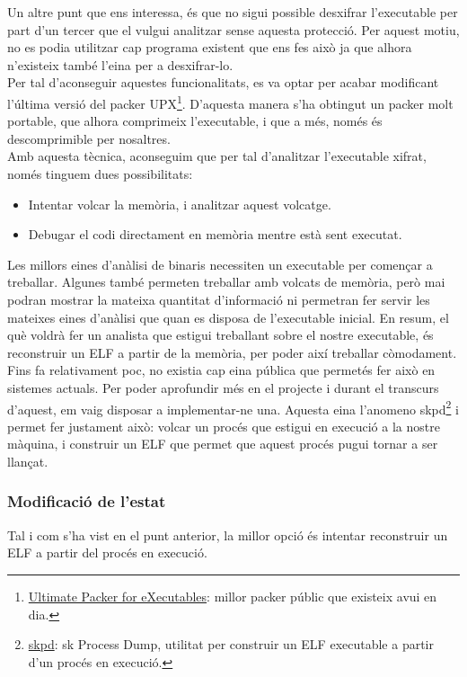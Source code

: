 Un altre punt que ens interessa, és que no sigui possible desxifrar l'executable per part d'un tercer que el vulgui 
analitzar sense aquesta protecció. Per aquest motiu, no es podia utilitzar cap programa existent que ens fes això
ja que alhora n'existeix també l'eina per a desxifrar-lo. \\

Per tal d'aconseguir aquestes funcionalitats, es va optar per acabar modificant 
l'última versió del packer UPX\footnote{\href{http://upx.sourceforge.net/}{Ultimate Packer for eXecutables}: 
millor packer públic que existeix avui en dia.}. D'aquesta manera s'ha obtingut un packer molt portable, que alhora 
comprimeix l'executable, i que a més, només és descomprimible per nosaltres. \\

Amb aquesta tècnica, aconseguim que per tal d'analitzar l'executable xifrat, només tinguem dues possibilitats: 
\begin{itemize}
	\item Intentar volcar la memòria, i analitzar aquest volcatge.
	\item Debugar el codi directament en memòria mentre està sent executat.
\end{itemize}

Les millors eines d'anàlisi de binaris necessiten un executable per començar a treballar. Algunes
també permeten treballar amb volcats de memòria, però mai podran mostrar la mateixa quantitat d'informació
ni permetran fer servir les mateixes eines d'anàlisi que quan es disposa de l'executable inicial. En resum,
el què voldrà fer un analista que estigui treballant sobre el nostre executable, és reconstruir un ELF 
a partir de la memòria, per poder així treballar còmodament. \\

Fins fa relativament poc, no existia cap eina pública que permetés fer això en sistemes actuals. Per  
poder aprofundir més en el projecte i durant el transcurs d'aquest, em vaig disposar a implementar-ne una.
Aquesta eina l'anomeno skpd\footnote{\href{http://www.wekk.net/skpd/}{skpd}: sk Process Dump, utilitat per
construir un ELF executable a partir d'un procés en execució.} i permet fer justament això: volcar un procés 
que estigui en execució a la nostre màquina, i construir un ELF que permet que aquest procés pugui tornar a ser llançat. 

\subsubsection{Modificació de l'estat}
Tal i com s'ha vist en el punt anterior, la millor opció és intentar reconstruir un ELF a partir del
procés en execució. \\

